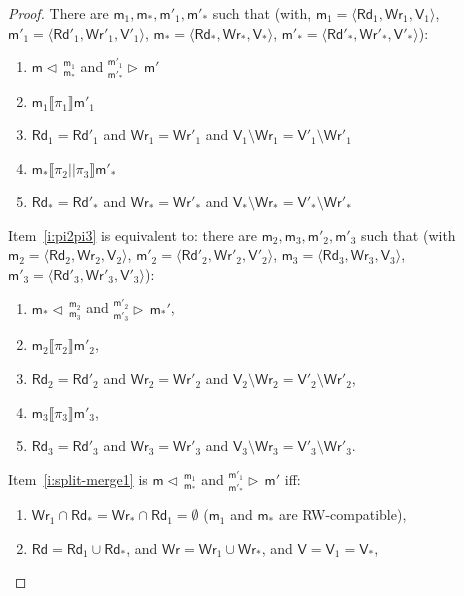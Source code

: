 \documentclass{llncs}
\newcommand{\modl}{\mathsf m}
\newcommand{\mrg}[3]{ ^{#2}_{#3} \triangleright \, #1 }
\newcommand{\pll}{ {||} }							%
\newcommand{\splt}[3]{ #1 \triangleleft \, ^{#2}_{#3} }
\newcommand{\readset}{\mathsf{Rd}}
\newcommand{\valuset}{\mathsf{V}}
\newcommand{\writeset}{\mathsf{Wr}}
\newcommand{\intPgm}[1]{\llbracket #1 \rrbracket}
\newcommand{\tuple}[1]{ \langle #1 \rangle}
\begin{document}
\begin{proof}
There are $\modl_1, \modl_*, \modl'_1, \modl'_*$ such that (with, $\modl_1 = \tuple{\readset_1, \writeset_1, \valuset_1}$, $\modl'_1 = \tuple{\readset'_1, \writeset'_1, \valuset'_1}$, $\modl_* = \tuple{\readset_*, \writeset_*, \valuset_*}$, $\modl'_* = \tuple{\readset'_*, \writeset'_*, \valuset'_*}$):
\begin{enumerate}
\item\label{i:split-merge1}\label{i:lhsfirst} $\splt{\modl}{\modl_1} {\modl_*}$
  and $\mrg{\modl'}{\modl'_1} {\modl'_*}$ 
\item $\modl_1 \intPgm{ \pi_1 } \modl'_1$
\item $\readset_1 = \readset'_1$
  and $\writeset_1 = \writeset'_1$
  and $\valuset_1 \setminus \writeset_1 = \valuset'_1 \setminus \writeset'_1$
\item\label{i:pi2pi3} $\modl_* \intPgm{ \pi_2 \pll \pi_3 } \modl'_*$ 
\item $\readset_* = \readset'_*$
  and $\writeset_* = \writeset'_*$ 
  and $\valuset_* \setminus \writeset_* = \valuset'_* \setminus \writeset'_*$
\end{enumerate}
Item~\ref{i:pi2pi3} is equivalent to: there are $\modl_2, \modl_3, \modl'_2, \modl'_3$ such that  (with $\modl_2 = \tuple{\readset_2, \writeset_2, \valuset_2}$, $\modl'_2 = \tuple{\readset'_2, \writeset'_2, \valuset'_2}$, $\modl_3 = \tuple{\readset_3, \writeset_3, \valuset_3}$, $\modl'_3 = \tuple{\readset'_3, \writeset'_3, \valuset'_3}$):
\begin{enumerate}[resume]
\item\label{i:split-merge2} $\splt{\modl_*}{\modl_2} {\modl_3} $ and $\mrg{\modl_*'}{\modl'_2} {\modl'_3} $,
\item $\modl_2 \intPgm{ \pi_2 } \modl'_2$, 
\item $\readset_2 = \readset'_2 $ and $\writeset_2 = \writeset'_2 $ and $\valuset_2 \setminus \writeset_2 = \valuset'_2 \setminus \writeset'_2$,
\item $\modl_3 \intPgm{ \pi_3 } \modl'_3$, 
\item $\readset_3 = \readset'_3 $ and $\writeset_3 = \writeset'_3 $ and $\valuset_3 \setminus \writeset_3 = \valuset'_3 \setminus \writeset'_3$.
\end{enumerate}
Item~\ref{i:split-merge1} is $\splt{\modl}{\modl_1} {\modl_*} $ and $\mrg{\modl'}{\modl'_1} {\modl'_*} $ iff:
\begin{enumerate}[resume]
\item
  $\writeset_1 \cap \readset_* = \writeset_* \cap \readset_1 = \emptyset$ ($\modl_1$ and $\modl_*$ are RW-compatible),
  \item 
    $\readset = \readset_1 \cup \readset_* $, and $\writeset = \writeset_1 \cup \writeset_*$, and $\valuset = \valuset_1 = \valuset_*$,


\end{enumerate}
\end{proof}
\end{document}
